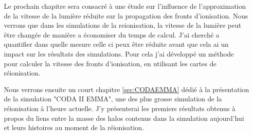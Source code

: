 



Le prochain chapitre sera consacré à une étude sur l'influence de l'approximation de la vitesse de la lumière réduite sur la propagation des fronts d'ionisation.
Nous verrons que dans les simulations de la reionisation, la vitesse de la lumière peut être changée de manière a économiser du temps de calcul.
J'ai cherché a quantifier dans quelle mesure celle ci peux être réduite avant que cela ai un impact sur les résultats des simulations.
Pour cela j'ai développé un méthode pour calculer la vitesse des fronts d'ionisation, en utilisant les cartes de réionisation.

Nous verrons ensuite un court chapitre \ref{sec:CODAEMMA} dédié à la présentation de la simulation "CODA II EMMA", une des plus grosse simulation de la réionisation à l'heure actuelle.
J'y présenterai les premiers résultats obtenus à propos du liens entre la masse des halos contenus dans la simulation aujourd'hui et leurs histoires au moment de la réionisation.

